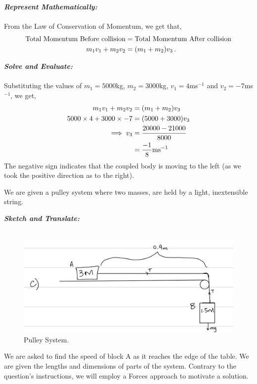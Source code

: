 \begin{subquestions}
	
	
	
	\textbf{\textit{Represent Mathematically:}} \\ \\
	From the Law of Conservation of Momentum, we get that,
	\begin{align}
		\text{Total Momentum Before collision} & = \text{Total Momentum After collision} \nonumber \\
		m_1v_1 + m_2v_2 & = (m_1+m_2)v_3 \,.
	\end{align}
	
	
	
	
	\textbf{\textit{Solve and Evaluate:}} \\ \\
	Substituting the values of $m_1=5000$kg, $m_2=3000$kg, $v_1=4$ms$^{-1}$ and $v_2=-7$ms$^{-1}$, we get,
	\begin{align}
		m_1v_1 + m_2v_2 & = (m_1+m_2)v_3 \nonumber \\
		5000\times4 + 3000\times-7 & = (5000+3000)v_3 \nonumber \\
		\implies v_3 & = \frac{20000-21000}{8000} \nonumber \\
		& = \frac{-1}{8}\text{ms}^{-1}
	\end{align}
	The negative sign indicates that the coupled body is moving to the left (as we took the positive direction as to the right).
	
	
	\subquestion
	We are given a pulley system where two masses, are held by a light, inextensible string.
	
	\textbf{\textit{Sketch and Translate:}} \\ \\
	\begin{figure}[H]
		\begin{center}
			\includegraphics[scale=0.25]{../2015/figures/2015q6-3}
			\caption{\label{2015:q66:fig:Sketch3} Pulley System.}
		\end{center}
	\end{figure}	
	We are asked to find the speed of block A as it reaches the edge of the table. We are given the lengths and dimensions of parts of the system. Contrary to the question's instructions, we will employ a Forces approach to motivate a solution.
	

\end{subquestions}
